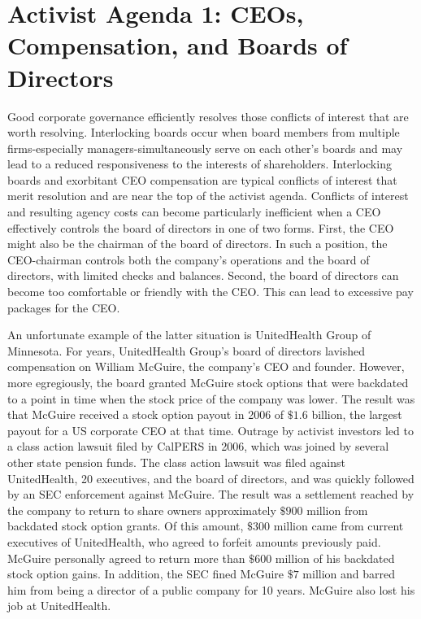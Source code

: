 \documentclass[11pt]{article}
\begin{document}
\section*{Activist Agenda 1: CEOs, Compensation, and Boards of Directors}
Good corporate governance efficiently resolves those conflicts of interest that are worth resolving. Interlocking boards occur when board members from multiple firms-especially managers-simultaneously serve on each other's boards and may lead to a reduced responsiveness to the interests of shareholders. Interlocking boards and exorbitant CEO compensation are typical conflicts of interest that merit resolution and are near the top of the activist agenda. Conflicts of interest and resulting agency costs can become particularly inefficient when a CEO effectively controls the board of directors in one of two forms. First, the CEO might also be the chairman of the board of directors. In such a position, the CEO-chairman controls both the company's operations and the board of directors, with limited checks and balances. Second, the board of directors can become too comfortable or friendly with the CEO. This can lead to excessive pay packages for the CEO.

An unfortunate example of the latter situation is UnitedHealth Group of Minnesota. For years, UnitedHealth Group's board of directors lavished compensation on William McGuire, the company's CEO and founder. However, more egregiously, the board granted McGuire stock options that were backdated to a point in time when the stock price of the company was lower. The result was that McGuire received a stock option payout in 2006 of $\$ 1.6$ billion, the largest payout for a US corporate CEO at that time. Outrage by activist investors led to a class action lawsuit filed by CalPERS in 2006, which was joined by several other state pension funds. The class action lawsuit was filed against UnitedHealth, 20 executives, and the board of directors, and was quickly followed by an SEC enforcement against McGuire. The result was a settlement reached by the company to return to share owners approximately $\$ 900$ million from backdated stock option grants. Of this amount, $\$ 300$ million came from current executives of UnitedHealth, who agreed to forfeit amounts previously paid. McGuire personally agreed to return more than $\$ 600$ million of his backdated stock option gains. In addition, the SEC fined McGuire $\$ 7$ million and barred him from being a director of a public company for 10 years. McGuire also lost his job at UnitedHealth.
\end{document}
